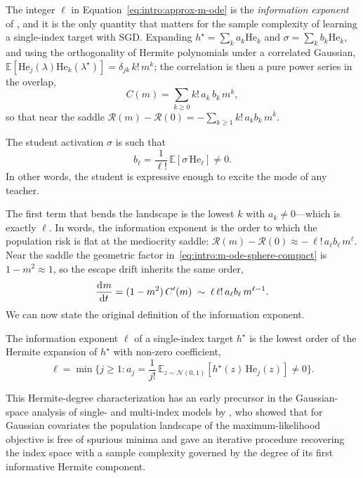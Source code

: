 The integer \(\ell\) in Equation~\eqref{eq:intro:approx-m-ode} is the \emph{information exponent} of \citet{arous2021online}, and it is the only quantity that matters for the sample complexity of learning a single-index target with SGD. Expanding \(h^\star = \sum_k a_k \mathrm{He}_k\) and \(\sigma = \sum_k b_k \mathrm{He}_k\), and using the orthogonality of Hermite polynomials under a correlated Gaussian, \(\mathbb{E}[\mathrm{He}_j(\lambda)\mathrm{He}_k(\lambda^\star)] = \delta_{jk}\,k!\,m^k\); the correlation is then a pure power series in the overlap,
\begin{equation} \label{eq:intro:correlation-series}
    C(m) = \sum_{k \geq 0} k!\,a_k\,b_k\, m^k,
\end{equation}
so that near the saddle \(\mathcal{R}(m) - \mathcal{R}(0) = -\sum_{k\geq1} k!\,a_k b_k\, m^k\).
\begin{assumption}
    The student activation \(\sigma\) is such that \[b_\ell = \frac{1}{\ell!}\,\mathbb{E}[\sigma\,\mathrm{He}_\ell] \neq 0.\]
    In other words, the student is expressive enough to excite the mode of any teacher.
\end{assumption}
The first term that bends the landscape is the lowest \(k\) with \(a_k \neq 0\)---which is exactly \(\ell\). In words, the information exponent is the order to which the population risk is flat at the mediocrity saddle: \(\mathcal{R}(m) - \mathcal{R}(0) \approx -\,\ell!\,a_\ell b_\ell\,m^\ell\). Near the saddle the geometric factor in~\eqref{eq:intro:m-ode-sphere-compact} is \(1 - m^2 \approx 1\), so the escape drift inherits the same order,
\begin{equation} \label{eq:intro:drift-ie}
    \dod{m}{t} = (1-m^2)\,C'(m) \;\sim\; \ell\,\ell!\,a_\ell b_\ell\, m^{\ell - 1}.
\end{equation}
We can now state the original definition of the information exponent.
\begin{definition}
    The information exponent \(\ell\) of a single-index target \(h^\star\) is the lowest order of the Hermite expansion of \(h^\star\) with non-zero coefficient,
    \begin{equation}\label{eq:intro:info-exponent}
        \ell = \min\{j \geq 1 : a_j = \frac{1}{j!}\,\mathbb{E}_{z\sim\mathcal{N}(0,1)}[h^\star(z)\,\mathrm{He}_j(z)] \neq 0\}.
    \end{equation}
\end{definition}

This Hermite-degree characterization has an early precursor in the Gaussian-space analysis of single- and multi-index models by \citet{dudeja2018learning}, who showed that for Gaussian covariates the population landscape of the maximum-likelihood objective is free of spurious minima and gave an iterative procedure recovering the index space with a sample complexity governed by the degree of its first informative Hermite component.


